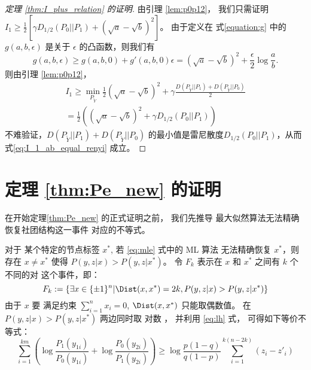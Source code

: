 \begin{proof}[定理 \ref{thm:I_plus_relation} 的证明]
    由引理 \ref{lem:p0p12}，
    我们只需证明 $I_1 \geq \frac{1}{2}[\gamma D_{1/2}(P_0||P_1)
    + (\sqrt{a} - \sqrt{b})^2]$。
    由于定义在 式\eqref{equation:g} 中的 $g(a,b,\epsilon)$ 是关于 $\epsilon$
    的凸函数，则我们有
    \begin{equation}\label{eq:g_linear}
            g(a,b,\epsilon) \geq g(a,b,0) + g'(a,b,0)\epsilon = (\sqrt{a} - \sqrt{b})^2 + \frac{\epsilon}{2}\log \frac{a}{b}. 
        \end{equation}
        则由引理 \ref{lem:p0p12}，
        \begin{align}
            I_1 \geq \min_{P_{\widetilde{Y}}}
            \frac{1}{2}(\sqrt{a}-\sqrt{b})^2+\gamma
            \frac{D(P_{\widetilde{Y}} || P_1) + D(P_{\widetilde{Y}} || P_0)}{2} \\
            = \frac{1}{2}((\sqrt{a}-\sqrt{b})^2+\gamma D_{1/2}(P_0||P_1))
            \label{eq:I_1_ab_equal_renyi}
        \end{align}
        不难验证，$D(P_{\widetilde{Y}} || P_1) + D(P_{\widetilde{Y}} || P_0)$
        的最小值是雷尼散度$D_{1/2}(P_0||P_1)$，从而
        式\eqref{eq:I_1_ab_equal_renyi} 成立。
\end{proof}
\section{定理 \ref{thm:Pe_new} 的证明}

在开始定理\ref{thm:Pe_new} 的正式证明之前，
我们先推导
最大似然算法无法精确恢复社团结构这一事件
对应的不等式。

对于
某个特定的节点标签
$x^*$,
若
\eqref{eq:mle} 式中的 ML 算法
无法精确恢复 
$x^*$，则
存在 $x\neq x^*$ 使得 $P(y,z|x) > P(y,z|x^*)$。
令 $F_k$ 表示在 $x$ 和 $x^*$ 之间有 $k$ 个不同的对
这个事件，即：
    \begin{equation}\label{eq:Fk}
    F_k:=\{\exists x \in \{\pm 1\}^n |
    \Dist(x, x^*)=2k,
    P(y,z|x) > 
    P(y,z|x^*) \}
    \end{equation}
    由于
    $x$ 要 满足约束
    $\sum_{i=1}^n x_i=0$,
    $\Dist(x, x^*)$
    只能取偶数值。
    在
    $P(y,z|x) > P(y,z|x^*)$
    两边同时取
    对数
    ， 并利用
    \eqref{eq:lh} 式，
    可得如下等价不等式：
    \begin{equation}\label{eq:ein}
    \sum_{i=1}^{km}
    \left(\log \frac{P_1(y_{1i})}
    {P_0(y_{1i})}
    + \log \frac{P_0(y_{2i})}
    {P_1(y_{2i})}
    \right)
    \geq \log \frac{p(1-q)}{q(1-p)} \sum_{i=1}^{k(n-2k)}(z_{i} - z'_{i})
    \end{equation}
    
